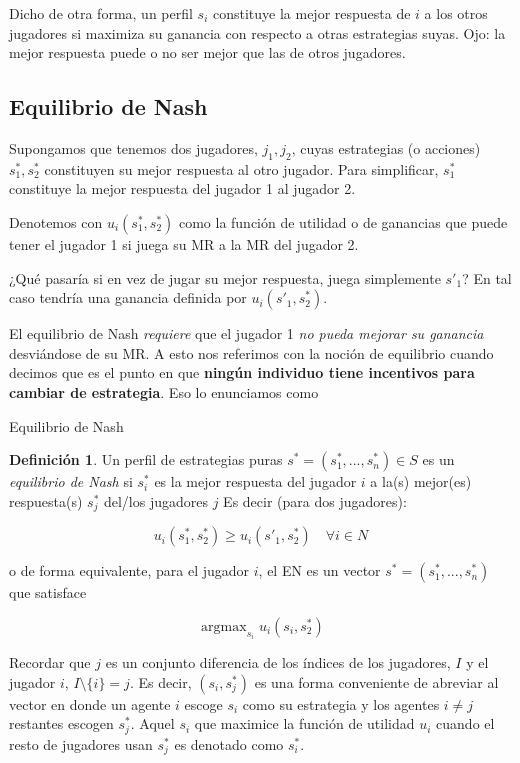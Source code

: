 \documentclass[12pt]{scrartcl}
\theoremstyle{definition}
\newtheorem{defi}{Definición}[section]
\DeclareMathOperator*{\argmax}{argmax}
\begin{document}
Dicho de otra forma, un perfil $s_i$ constituye la mejor respuesta de $i$ a los otros jugadores si maximiza su ganancia con respecto a otras estrategias suyas. Ojo: la mejor respuesta puede o no ser mejor que las de otros jugadores. 

\subsection{Equilibrio de Nash}

Supongamos que tenemos dos jugadores, $j_1, j_2$, cuyas estrategias (o acciones) $s_1^*, s_2^*$ constituyen su mejor respuesta al otro jugador. Para simplificar, $s_1^*$ constituye la mejor respuesta del jugador 1 al jugador 2. 

Denotemos con $u_i(s_1^*, s_2^*)$ como la función de utilidad o de ganancias que puede tener el jugador 1 si juega su MR a la MR del jugador 2. 

¿Qué pasaría si en vez de jugar su mejor respuesta, juega simplemente $s'_1$? En tal caso tendría una ganancia definida por $u_i(s'_1, s_2^*)$.

El equilibrio de Nash \textit{requiere} que el jugador 1 \textit{no pueda mejorar su ganancia} desviándose de su MR. A esto nos referimos con la noción de equilibrio cuando decimos que es el punto en que \textbf{ningún individuo tiene incentivos para cambiar de estrategia}. Eso lo enunciamos como

\begin{mybox}{Equilibrio de Nash}
	\begin{defi}
		Un perfil de estrategias puras $s^*=(s_1^*, ..., s_n^*) \in S$ es un \textit{equilibrio de Nash} si $s_i^*$ es la mejor respuesta del jugador $i$ a la(s) mejor(es) respuesta(s) $s_{j}^*$ del/los jugadores $j$
	 Es decir (para dos jugadores):
	 
		\[u_i(s_1^*, s_2^*)\geq u_i(s'_1, s_2^*)\quad \forall i \in N\]
		
		o de forma equivalente, para el jugador $i$, el EN es un vector $s^*=(s_1^*, ..., s_n^*)$ que satisface
		
		\[ \argmax_{s_i}u_i(s_i, s_2^*)\]
		
	\end{defi}
\end{mybox}

Recordar que $j$ es un conjunto diferencia de los índices de los jugadores, $I$ y el jugador $i$, $I\setminus\{i\}=j$. Es decir, $(s_i, s_{j}^*)$ es una forma conveniente de abreviar al vector en donde un agente $i$ escoge $s_i$ como su estrategia y los agentes $i \neq j$ restantes escogen $s_j^*$. Aquel $s_i$ que maximice la función de utilidad $u_i$ cuando el resto de jugadores usan $s_j^*$ es denotado como $s_i^*$.
\end{document}
